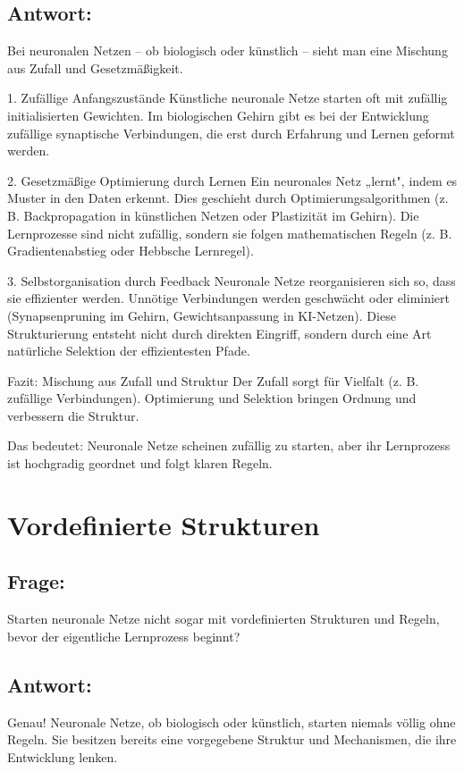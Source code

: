 \documentclass{article}
\begin{document}
	\subsection*{Antwort:}
	Bei neuronalen Netzen – ob biologisch oder künstlich – sieht man eine Mischung aus Zufall und Gesetzmäßigkeit.
	
	1. Zufällige Anfangszustände
	Künstliche neuronale Netze starten oft mit zufällig initialisierten Gewichten.
	Im biologischen Gehirn gibt es bei der Entwicklung zufällige synaptische Verbindungen, die erst durch Erfahrung und Lernen geformt werden.
	
	2. Gesetzmäßige Optimierung durch Lernen
	Ein neuronales Netz „lernt", indem es Muster in den Daten erkennt.
	Dies geschieht durch Optimierungsalgorithmen (z. B. Backpropagation in künstlichen Netzen oder Plastizität im Gehirn).
	Die Lernprozesse sind nicht zufällig, sondern sie folgen mathematischen Regeln (z. B. Gradientenabstieg oder Hebbsche Lernregel).
	
	3. Selbstorganisation durch Feedback
	Neuronale Netze reorganisieren sich so, dass sie effizienter werden.
	Unnötige Verbindungen werden geschwächt oder eliminiert (Synapsenpruning im Gehirn, Gewichtsanpassung in KI-Netzen).
	Diese Strukturierung entsteht nicht durch direkten Eingriff, sondern durch eine Art natürliche Selektion der effizientesten Pfade.
	
	Fazit: Mischung aus Zufall und Struktur
	Der Zufall sorgt für Vielfalt (z. B. zufällige Verbindungen).
	Optimierung und Selektion bringen Ordnung und verbessern die Struktur.
	
	Das bedeutet: Neuronale Netze scheinen zufällig zu starten, aber ihr Lernprozess ist hochgradig geordnet und folgt klaren Regeln.
	
	\section{Vordefinierte Strukturen}
	
	\subsection*{Frage:}
	Starten neuronale Netze nicht sogar mit vordefinierten Strukturen und Regeln, bevor der eigentliche Lernprozess beginnt?
	
	\subsection*{Antwort:}
	Genau! Neuronale Netze, ob biologisch oder künstlich, starten niemals völlig ohne Regeln. Sie besitzen bereits eine vorgegebene Struktur und Mechanismen, die ihre Entwicklung lenken.
	
\end{document}
